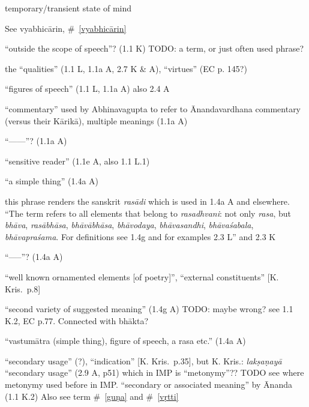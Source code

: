 \documentclass[12pt]{article}
\begin{document}
\begin{multicols}{2}
\begin{enumerate}
		 temporary/transient state of mind

		 See vyabhicārin, \#~\ref{vyabhicārin}

		 ``outside the scope of speech''? (1.1 K) TODO: a term, or just often used phrase?

		 the ``qualities'' (1.1 L, 1.1a A, 2.7 K \& A), ``virtues'' (EC p. 145?)

		 ``figures of speech'' (1.1 L, 1.1a A) also 2.4 A

		 ``commentary'' used by Abhinavagupta to refer to Ānandavardhana commentary (versus their Kārikā), multiple meanings (1.1a A)

		 ``------''? (1.1a A)

		 ``sensitive reader'' (1.1e A, also 1.1 L.1)

		 ``a simple thing'' (1.4a A)

		 this phrase renders the sanskrit \textit{rasādi} which is used in 1.4a A and elsewhere.
		``The term refers to all elements that belong to \textit{rasadhvani}:
		not only \textit{rasa}, but \textit{bhāva}, \textit{rasā\-bhāsa}, \textit{bhāvābhāsa}, \textit{bhāvodaya}, \textit{bhāvasandhi}, \textit{bhāva\-śabala}, \textit{bhā\-vapraśama}.
		For definitions see 1.4g and for examples 2.3 L''
		and 2.3 K

		 ``-----''? (1.4a A)

		 ``well known ornamented elements [of poetry]'', ``external constituents'' [K. Kris.\ p.8]

		 ``second variety of suggested meaning'' (1.4g A)
		TODO: maybe wrong? see 1.1 K.2, EC p.77. Connected with bhākta?


		 ``vastumātra (simple thing), figure of speech, a rasa etc.'' (1.4a A)

		 ``secondary usage'' (?), ``indication'' [K. Kris.\ p.35],
		but K. Kris.: \textit{lakṣaṇayā} ``secondary usage'' (2.9 A, p51) which in IMP is ``metonymy''??
		TODO see where metonymy used before in IMP.
		``secondary or associated meaning'' by Ānanda (1.1 K.2)
		Also see term \#~\ref{guṇa} and \#~\ref{vṛtti}


\end{enumerate}
\end{multicols}
\end{document}
